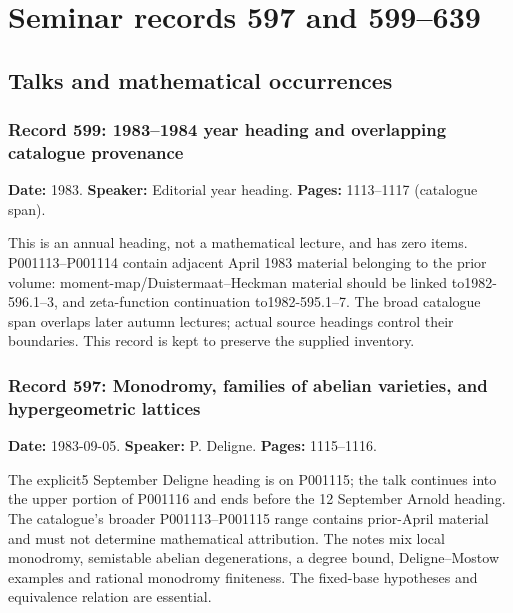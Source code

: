 
\chapter{Seminar records 597 and 599--639}

\label{ch:GY1983}



\section{Talks and mathematical occurrences}

\subsection{Record 599: 1983--1984 year heading and overlapping catalogue provenance}

\label{talk:599}

\noindent\textbf{Date:} 1983. \textbf{Speaker:} Editorial year heading. \textbf{Pages:} 1113--1117 (catalogue span).\par

This is an annual heading, not a mathematical lecture, and has zero items. P001113--P001114 contain adjacent April 1983 material belonging to the prior volume: moment-map/Duistermaat--Heckman material should be linked to1982-596.1--3, and zeta-function continuation to1982-595.1--7. The broad catalogue span overlaps later autumn lectures; actual source headings control their boundaries. This record is kept to preserve the supplied inventory.

\subsection{Record 597: Monodromy, families of abelian varieties, and hypergeometric lattices}

\label{talk:597}

\noindent\textbf{Date:} 1983-09-05. \textbf{Speaker:} P. Deligne. \textbf{Pages:} 1115--1116.\par

The explicit5 September Deligne heading is on P001115; the talk continues into the upper portion of P001116 and ends before the 12 September Arnold heading. The catalogue's broader P001113--P001115 range contains prior-April material and must not determine mathematical attribution. The notes mix local monodromy, semistable abelian degenerations, a degree bound, Deligne--Mostow examples and rational monodromy finiteness. The fixed-base hypotheses and equivalence relation are essential.

